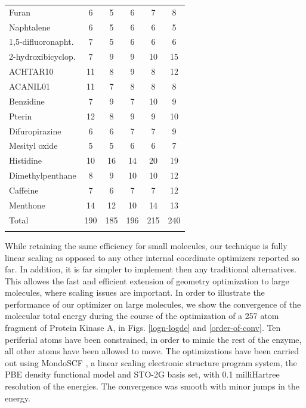 \documentclass[prl,aps,twocolumn,showpacs,twocolumngrid,superbib]{revtex4}
\begin{document}
\begin{table}[h]
\begin{tabular}{lccccc}
Furan                  &   6    &   5    &    6    &    7   &   8     \\
Naphtalene             &   6    &   5    &    6    &    6   &   5     \\
1,5-difluoronapht.     &   7    &   5    &    6    &    6   &   6     \\
2-hydroxibicyclop.     &   7    &   9    &    9    &   10   &  15     \\
ACHTAR10               &  11    &   8    &    9    &    8   &  12     \\
ACANIL01               &  11    &   7    &    8    &    8   &   8     \\
Benzidine              &   7    &   9    &    7    &   10   &   9     \\
Pterin                 &  12    &   8    &    9    &    9   &  10     \\
Difuropirazine         &   6    &   6    &    7    &    7   &   9     \\
Mesityl oxide          &   5    &   5    &    6    &    6   &   7     \\
Histidine              &  10    &  16    &   14    &   20   &  19     \\
Dimethylpenthane       &   8    &   9    &   10    &   10   &  12     \\
Caffeine               &   7    &   6    &    7    &    7   &  12     \\
Menthone               &  14    &  12    &   10    &   14   &  13     \\
\colrule
Total                  & 190    & 185    &  196    &  215   & 240     \\
\botrule
\end{tabular}
\end{table}

While retaining the same efficiency for small molecules, our technique
is fully linear scaling as opposed to any other internal 
coordinate optimizers reported so far. In addition, it is far simpler
to implement then any traditional alternatives.
This allowes the fast and efficient 
extension of geometry optimization 
to large molecules, where scaling issues are important.
In order to illustrate the performance of our optimizer on large
molecules, we show the convergence of the molecular total energy
during the course of the optimization of a 257 atom
fragment of Protein Kinase A, in Figs. \ref{logn-logde} 
and \ref{order-of-conv}. Ten periferial atoms have been 
constrained, in order to mimic the rest of the enzyme, 
all other atoms have been allowed to move.
The optimizations have been carried out 
using MondoSCF \cite{MondoSCF}, a linear scaling electronic structure
program system, the PBE density functional model and 
STO-2G basis set, with 0.1 milliHartree resolution of the energies.
The convergence was smooth with minor jumps in the energy.
\end{document}

